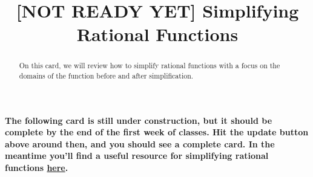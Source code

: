 \documentclass{ximera}
\title[Dig-In:]{[NOT READY YET] Simplifying Rational Functions}
\begin{document}
\begin{abstract}
On this card, we will review how to simplify rational functions with a focus on the domains of the function before and after simplification. 
\end{abstract}
\maketitle

\textbf{The following card is still under construction, but it should be complete by the end of the first week of classes.  Hit the update button above around then, and you should see a complete card.  In the meantime you'll find a useful resource for simplifying rational functions \href{https://www.khanacademy.org/math/algebra2/rational-expressions-equations-and-functions/simplify-rational-expressions/a/intro-to-rational-expressions}{here}.}
\end{document}
